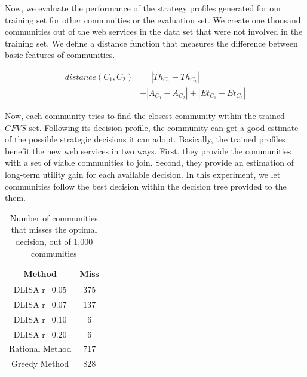 \documentclass[10pt,journal,cspaper,compsoc]{IEEEtran}
\begin{document}
Now, we evaluate the performance of the strategy profiles generated for our training set for other communities or the evaluation set. We create one thousand communities out of the web services in the data set that were not involved in the training set. We define a distance function that measures the difference between basic features of communities.

\begin{equation}\label{distance_c}
\begin{split}
distance (C_1, C_2) & = |Th_{C_1} - Th_{C_2}| \\
                    & + |A_{C_1} - A_{C_2}| + |Et_{C_1} - Et_{C_2}|
\end{split}
\end{equation}

Now, each community tries to find the closest community within the trained $CFVS$ set. Following its decision profile, the community can get a good estimate of the possible strategic decisions it can adopt. Basically, the trained profiles benefit the new web services in two ways. First, they provide the communities with a set of viable communities to join. Second, they provide an estimation of long-term utility gain for each available decision. In this experiment, we let communities follow the best decision within the decision tree provided to the them. 

\begin{table}[h]
\begin{tabular}{|c|c|}
\hline
 Method&Miss\\ \hline
 DLISA r=0.05& 375 \\ \hline
 DLISA r=0.07& 137 \\ \hline
 DLISA r=0.10& 6 \\ \hline
 DLISA r=0.20& 6 \\ \hline
Rational Method& 717 \\ \hline
Greedy Method& 828 \\ \hline
\end{tabular}
\caption{Number of communities that misses the optimal decision, out of 1,000 communities}
\label{fail_rate}
\end{table}
\end{document}
